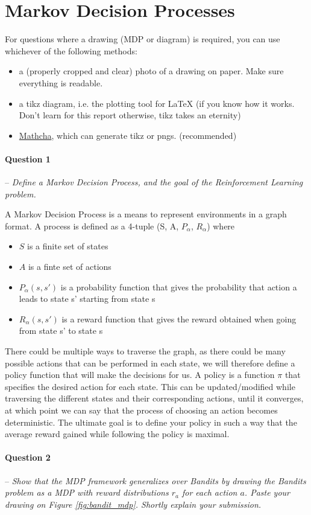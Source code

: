 \documentclass[a4paper]{article}
\newcommand{\question}[2]{
\paragraph{Question #1} -- \textit{#2}

}
\begin{document}
\section{Markov Decision Processes}
For questions where a drawing (MDP or diagram) is required, you can use whichever of the following methods:
\begin{itemize}
    \item a (properly cropped and clear) photo of a drawing on paper. Make sure everything is readable.
    \item a tikz diagram, i.e. the plotting tool for LaTeX (if you know how it works. Don't learn for this report otherwise, tikz takes an eternity)
    \item \href{www.mathcha.io}{Mathcha}, which can generate tikz or pngs. (recommended)
\end{itemize}{}

\question{1}{Define a Markov Decision Process, and the goal of the Reinforcement Learning problem.}
A Markov Decision Process is a means to represent environments in a graph format. A process is defined as a 4-tuple (S, A, $P_\alpha$, $R_\alpha$) where
\begin{itemize}
	\item $S$ is a finite set of states
	\item $A$ is a finte set of actions
	\item $P_\alpha(s, s')$ is a probability function that gives the probability that action a leads to state s' starting from state s
	\item $R_\alpha(s, s')$ is a reward function that gives the reward obtained when going from state s' to state s
\end{itemize}

There could be multiple ways to traverse the graph, as there could be many possible actions that can be performed in each state, we will therefore define a policy function that will make the decisions for us. A policy is a function $\pi$ that specifies the desired action for each state. This can be updated/modified while traversing the different states and their corresponding actions, until it converges, at which point we can say that the process of choosing an action becomes deterministic. The ultimate goal is to define your policy in such a way that the average reward gained while following the policy is maximal.

\question{2}{Show that the MDP framework generalizes over Bandits by drawing the Bandits problem as a MDP with reward distributions $r_a$ for each action $a$. Paste your drawing on Figure \ref{fig:bandit_mdp}. Shortly explain your submission.}
\end{document}
